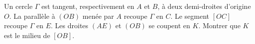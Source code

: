 Un cercle $\Gamma$ est tangent, respectivement en $A$ et $B$, à deux demi-droites d'origine $O$. La parallèle à $(OB)$ menée par $A$ recoupe $\Gamma$ en $C$. Le segment $[OC]$ recoupe $\Gamma$ en $E$. Les droites $(AE)$ et $(OB)$ se coupent en $K$. Montrer que $K$ est le milieu de $[OB]$.
